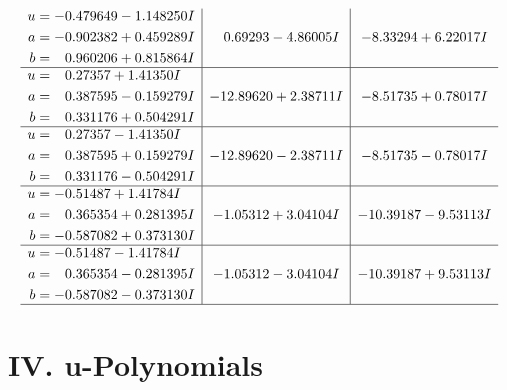 \documentclass[1p]{elsarticle_modified}
\theoremstyle{definition}
\begin{document}
$$\begin{array}{c|c|c}
\begin{aligned}
u &= -0.479649 - 1.148250 I \\
a &= -0.902382 + 0.459289 I \\
b &= \phantom{-}0.960206 + 0.815864 I\end{aligned}
 & \phantom{-}0.69293 - 4.86005 I & -8.33294 + 6.22017 I \\ \hline\begin{aligned}
u &= \phantom{-}0.27357 + 1.41350 I \\
a &= \phantom{-}0.387595 - 0.159279 I \\
b &= \phantom{-}0.331176 + 0.504291 I\end{aligned}
 & -12.89620 + 2.38711 I & -8.51735 + 0.78017 I \\ \hline\begin{aligned}
u &= \phantom{-}0.27357 - 1.41350 I \\
a &= \phantom{-}0.387595 + 0.159279 I \\
b &= \phantom{-}0.331176 - 0.504291 I\end{aligned}
 & -12.89620 - 2.38711 I & -8.51735 - 0.78017 I \\ \hline\begin{aligned}
u &= -0.51487 + 1.41784 I \\
a &= \phantom{-}0.365354 + 0.281395 I \\
b &= -0.587082 + 0.373130 I\end{aligned}
 & -1.05312 + 3.04104 I & -10.39187 - 9.53113 I \\ \hline\begin{aligned}
u &= -0.51487 - 1.41784 I \\
a &= \phantom{-}0.365354 - 0.281395 I \\
b &= -0.587082 - 0.373130 I\end{aligned}
 & -1.05312 - 3.04104 I & -10.39187 + 9.53113 I\\
 \hline 
 \end{array}$$\newpage
\newpage\renewcommand{\arraystretch}{1}
\centering \section*{ IV. u-Polynomials}
\end{document}
